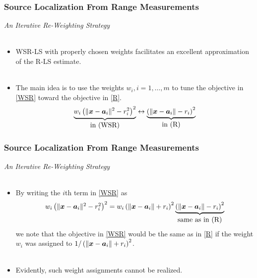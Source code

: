 \documentclass [t] {beamer} %
\begin{document}
\begin{frame} %
\frametitle{Source Localization From Range Measurements}
{\large \textit{An Iterative Re-Weighting Strategy}} \\~\\
\normalsize
\begin{itemize}
\item 
WSR-LS with properly chosen weights facilitates an excellent approximation of the R-LS estimate. \\~\\

\item 
The main idea is to use the weights ${w_i, i = 1, \ldots, m}$ to tune the objective in \eqref{WSR} toward the objective in \eqref{R}. %
\begin{equation} 
\nonumber
\underbrace{w_i\left(\|\mbox{\boldmath$x$}-\mbox{\boldmath$a$}_i\|^2-r_i^2\right)^2}_{\mbox{in (WSR)}}\leftrightarrow\underbrace{\left(\|\mbox{\boldmath$x$}-\mbox{\boldmath$a$}_i\|-r_i\right)^2}_{\mbox{in (R)}}
\end{equation}
\end{itemize}
\end{frame}



\begin{frame} %
\frametitle{Source Localization From Range Measurements}
{\large \textit{An Iterative Re-Weighting Strategy}} \\~\\
\normalsize
\begin{itemize}
\item 
By writing the $i$th term in \eqref{WSR} as
\begin{equation}
\nonumber
\begin{array}{l}
w_i\left(\|\mbox{\boldmath$x$}-\mbox{\boldmath$a$}_i\|^2-r_i^2\right)^2 = w_i\left(\|\mbox{\boldmath$x$}-\mbox{\boldmath$a$}_i\|+r_i\right)^2 \underbrace{\left(\|\mbox{\boldmath$x$}-\mbox{\boldmath$a$}_i\|-r_i\right)^2}_{\mbox{same as in (R)}}
\end{array}
\end{equation}
we note that the objective in \eqref{WSR} would be the same as in \eqref{R} if the weight $w_i$ was assigned to $1/\left(\|\mbox{\boldmath$x$}-\mbox{\boldmath$a$}_i\|+r_i\right)^2$. \\~\\
\item 
Evidently, such weight assignments cannot be realized.
\end{itemize}
\end{frame}
\end{document}
